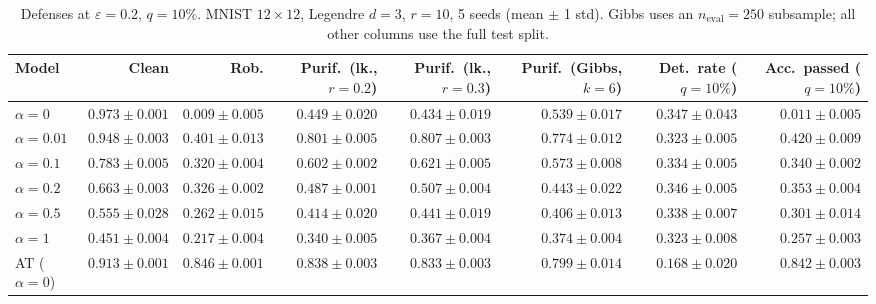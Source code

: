 \begin{table}[htbp]
  \centering
  \small
  \begin{tabular}{@{}lrrrrrrr@{}}
    \toprule
    Model & Clean & Rob. & Purif.\ (lk., $r{=}0.2$) & Purif.\ (lk., $r{=}0.3$) & Purif.\ (Gibbs, $k{=}6$) & Det.\ rate ($q{=}10\%$) & Acc.\ passed ($q{=}10\%$) \\
    \midrule
    $\alpha{=}0$ & $\mathbf{0.973 \pm 0.001}$ & $0.009 \pm 0.005$ & $0.449 \pm 0.020$ & $0.434 \pm 0.019$ & $0.539 \pm 0.017$ & $\mathbf{0.347 \pm 0.043}$ & $0.011 \pm 0.005$ \\
    $\alpha{=}0.01$ & $0.948 \pm 0.003$ & $0.401 \pm 0.013$ & $0.801 \pm 0.005$ & $0.807 \pm 0.003$ & $0.774 \pm 0.012$ & $0.323 \pm 0.005$ & $0.420 \pm 0.009$ \\
    $\alpha{=}0.1$ & $0.783 \pm 0.005$ & $0.320 \pm 0.004$ & $0.602 \pm 0.002$ & $0.621 \pm 0.005$ & $0.573 \pm 0.008$ & $0.334 \pm 0.005$ & $0.340 \pm 0.002$ \\
    $\alpha{=}0.2$ & $0.663 \pm 0.003$ & $0.326 \pm 0.002$ & $0.487 \pm 0.001$ & $0.507 \pm 0.004$ & $0.443 \pm 0.022$ & $0.346 \pm 0.005$ & $0.353 \pm 0.004$ \\
    $\alpha{=}0.5$ & $0.555 \pm 0.028$ & $0.262 \pm 0.015$ & $0.414 \pm 0.020$ & $0.441 \pm 0.019$ & $0.406 \pm 0.013$ & $0.338 \pm 0.007$ & $0.301 \pm 0.014$ \\
    $\alpha{=}1$ & $0.451 \pm 0.004$ & $0.217 \pm 0.004$ & $0.340 \pm 0.005$ & $0.367 \pm 0.004$ & $0.374 \pm 0.004$ & $0.323 \pm 0.008$ & $0.257 \pm 0.003$ \\
    AT ($\alpha{=}0$) & $0.913 \pm 0.001$ & $\mathbf{0.846 \pm 0.001}$ & $\mathbf{0.838 \pm 0.003}$ & $\mathbf{0.833 \pm 0.003}$ & $\mathbf{0.799 \pm 0.014}$ & $0.168 \pm 0.020$ & $\mathbf{0.842 \pm 0.003}$ \\
    \bottomrule
  \end{tabular}
  \caption{Defenses at $\varepsilon=0.2$, $q{=}10\%$. MNIST $12\times12$, Legendre $d{=}3$, $r{=}10$, 5 seeds (mean $\pm$ 1 std). Gibbs uses an $n_{\mathrm{eval}}=250$ subsample; all other columns use the full test split.}
  \label{tab:mnist_r12_models_r10_eps0.2}
\end{table}
